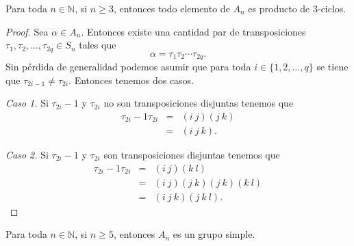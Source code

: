 \begin{lema}
    Para toda $n\in \mathbb{N}$, si $n\geq 3$, entonces todo elemento de $A_n$ es producto de $3$-ciclos.
\end{lema}
\begin{proof}
    Sea $\alpha\in A_n$. Entonces existe una cantidad par de transposiciones $\tau_1, \tau_2, \ldots, \tau_{2q}\in S_n$ tales que
    \[\alpha = \tau_1 \tau_2 \cdots \tau_{2q}.\]
    Sin p\'erdida de generalidad podemos asumir que para toda $i\in \{1,2, \ldots, q\}$ se tiene que $\tau_{2i-1}\neq \tau_{2i}$. Entonces tenemos dos casos.
    
    \textit{Caso 1. }  Si $\tau_{2i}-1$ y $\tau_{2i}$ no son transposiciones disjuntas tenemos que
    \begin{eqnarray*}
	\tau_{2i}-1\tau_{2i}	&	=&	(i\ j)(j\ k)			\\
				&	=&	(i\ j\ k).
    \end{eqnarray*}
    
    \textit{Caso 2. } Si $\tau_{2i}-1$ y $\tau_{2i}$ son transposiciones disjuntas tenemos que
    \begin{eqnarray*}
	\tau_{2i}-1\tau_{2i}	&	=&	(i\ j)(k\ l)			\\
				&	=&	(i\ j)(j\ k)(j\ k)(k\ l)	\\
				&	=&	(i\ j\ k)(j\ k\ l).
    \end{eqnarray*}
\end{proof}



\begin{teorema}
    Para toda $n\in \mathbb{N}$, si $n\geq 5$, entonces $A_n$ es un grupo simple.
\end{teorema}

